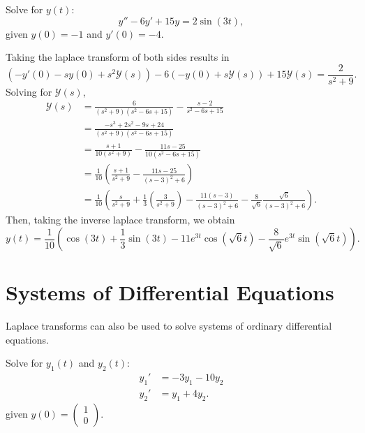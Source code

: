 \begin{example}
    Solve for $y(t)$:
    $$y''-6y'+15y = 2\sin(3t),$$
    given $y(0)=-1$ and $y'(0)=-4$.
\end{example}
\begin{soln}
    Taking the laplace transform of both sides results in
    $$\left( -y'(0)-sy(0)+s^2\mathcal{Y}(s)\right)-6\left( -y(0)+s\mathcal{Y}(s)\right)+15\mathcal{Y}(s) = \frac{2}{s^2+9}.$$
    Solving for $\mathcal{Y}(s)$,
    \begin{align*}
        \mathcal{Y}(s) &= \frac{6}{(s^2+9)(s^2-6s+15)}-\frac{s-2}{s^2-6s+15} \\
                       &= \frac{-s^3+2s^2-9s+24}{(s^2+9)(s^2-6s+15)} \\
                       &= \frac{s+1}{10(s^2+9)}-\frac{11s-25}{10(s^2-6s+15)} \\
                       &= \frac{1}{10}\left(\frac{s+1}{s^2+9}-\frac{11s-25}{(s-3)^2+6}\right) \\
                       &= \frac{1}{10}\left( \frac{s}{s^2+9} + \frac{1}{3}\left(\frac{3}{s^2+9}\right)-\frac{11(s-3)}{(s-3)^2+6}-\frac{8}{\sqrt{6}}\frac{\sqrt{6}}{(s-3)^2+6}\right).
    \end{align*}
    Then, taking the inverse laplace transform, we obtain
    $$y(t) = \frac{1}{10}\left( \cos(3t)+\frac{1}{3}\sin(3t)-11e^{3t}\cos(\sqrt{6}t)-\frac{8}{\sqrt{6}}e^{3t}\sin(\sqrt{6}t)\right).$$
\end{soln}

\section{Systems of Differential Equations}
Laplace transforms can also be used to solve systems of ordinary differential
equations.

\begin{example}
    Solve for $y_1(t)$ and $y_2(t)$:
    \begin{align*}
        y_1' &= -3y_1-10y_2 \\
        y_2' &= y_1+4y_2.
    \end{align*}
    given $y(0) = \begin{pmatrix} 1 \\ 0 \end{pmatrix}$.
\end{example}

